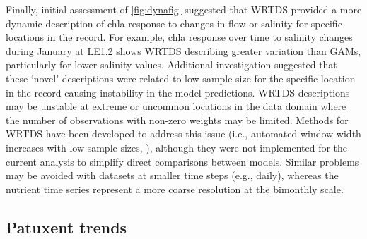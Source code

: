 \documentclass{svjour3}\usepackage[]{graphicx}\usepackage[]{color}
\begin{document}
Finally, initial assessment of \cref{fig:dynafig} suggested that \ac{WRTDS} provided a more dynamic description of \ac{chla} response to changes in flow or salinity for specific locations in the record.  For example, \ac{chla} response over time to salinity changes during January at LE1.2 shows \ac{WRTDS} describing greater variation than \acp{GAM}, particularly for lower salinity values.  Additional investigation suggested that these `novel' descriptions were related to low sample size for the specific location in the record causing instability in the model predictions.   \ac{WRTDS} descriptions may be unstable at extreme or uncommon locations in the data domain where the number of observations with non-zero weights may be limited.  Methods for \ac{WRTDS} have been developed to address this issue (i.e., automated window width increases with low sample sizes, \cite{Hirsch10}), although they were not implemented for the current analysis to simplify direct comparisons between models.  Similar problems may be avoided with datasets at smaller time steps (e.g., daily), whereas the nutrient time series represent a more coarse resolution at the bimonthly scale.    

\subsection{Patuxent trends}
\end{document}
